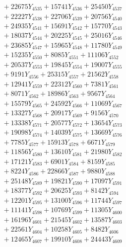 \documentclass[a4paper,10pt]{article}
\begin{document}
{\begin{align}
&\;  + 22675 Y_{4535} + 15741 Y_{4536} + 25450 Y_{4537} \\[0.3ex]
&\;  + 22227 Y_{4538} + 22706 Y_{4539} + 20756 Y_{4540} \\[0.3ex]
&\;  + 24935 Y_{4541} + 15691 Y_{4542} + 15770 Y_{4543} \\[0.3ex]
&\;  + 18037 Y_{4544} + 20225 Y_{4545} + 25016 Y_{4546} \\[0.3ex]
&\;  + 23685 Y_{4547} + 15965 Y_{4548} + 11780 Y_{4549} \\[0.3ex]
&\;  + 15235 Y_{4550} + 8085 Y_{4551} + 11106 Y_{4552} \\[0.3ex]
&\;  + 20537 Y_{4553} + 19845 Y_{4554} + 19007 Y_{4555} \\[0.3ex]
&\;  + 9191 Y_{4556} + 25315 Y_{4557} + 21562 Y_{4558} \\[0.5ex]\allowbreak
&\;  + 12941 Y_{4559} + 22312 Y_{4560} + 7381 Y_{4561} \\[0.3ex]
&\;  + 8071 Y_{4562} + 18986 Y_{4563} + 9567 Y_{4564} \\[0.3ex]
&\;  + 15579 Y_{4565} + 24592 Y_{4566} + 11069 Y_{4567} \\[0.3ex]
&\;  + 13327 Y_{4568} + 20917 Y_{4569} + 9156 Y_{4570} \\[0.3ex]
&\;  + 13338 Y_{4571} + 20577 Y_{4572} + 13654 Y_{4573} \\[0.3ex]
&\;  + 19098 Y_{4574} + 14039 Y_{4575} + 13669 Y_{4576} \\[0.3ex]
&\;  + 7785 Y_{4577} + 15913 Y_{4578} + 6671 Y_{4579} \\[0.3ex]
&\;  + 11856 Y_{4580} + 13610 Y_{4581} + 21980 Y_{4582} \\[0.3ex]
&\;  + 17121 Y_{4583} + 6901 Y_{4584} + 8159 Y_{4585} \\[0.3ex]
&\;  + 8224 Y_{4586} + 22866 Y_{4587} + 9880 Y_{4588} \\[0.5ex]\allowbreak
&\;  + 25148 Y_{4589} + 19821 Y_{4590} + 17097 Y_{4591} \\[0.3ex]
&\;  + 18377 Y_{4592} + 20625 Y_{4593} + 8142 Y_{4594} \\[0.3ex]
&\;  + 12201 Y_{4595} + 13100 Y_{4596} + 11744 Y_{4597} \\[0.3ex]
&\;  + 11141 Y_{4598} + 10769 Y_{4599} + 11305 Y_{4600} \\[0.3ex]
&\;  + 16196 Y_{4601} + 21545 Y_{4602} + 13587 Y_{4603} \\[0.3ex]
&\;  + 22561 Y_{4604} + 10258 Y_{4605} + 8482 Y_{4606} \\[0.3ex]
&\;  + 12465 Y_{4607} + 19910 Y_{4608} + 24443 Y_{4609} \\[0.3ex]

\end{align}}
\end{document}
